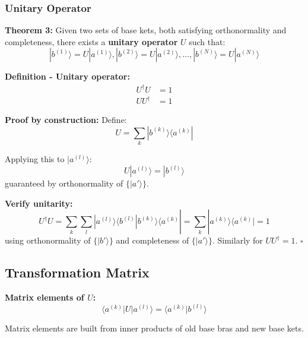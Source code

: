 \documentclass[11pt,a4paper]{article}
\begin{document}
\subsubsection{Unitary Operator}

\textbf{Theorem 3:} Given two sets of base kets, both satisfying orthonormality and completeness, there exists a \textbf{unitary operator} $U$ such that:
\begin{equation}
|b^{(1)}\rangle = U|a^{(1)}\rangle, |b^{(2)}\rangle = U|a^{(2)}\rangle, \ldots, |b^{(N)}\rangle = U|a^{(N)}\rangle
\tag{1.157}
\end{equation}

\textbf{Definition - Unitary operator:}
\begin{align}
U^\dagger U &= 1 \tag{1.158} \\
UU^\dagger &= 1 \tag{1.159}
\end{align}

\textbf{Proof by construction:}
Define:
\begin{equation}
U = \sum_k |b^{(k)}\rangle\langle a^{(k)}|
\tag{1.160}
\end{equation}

Applying this to $|a^{(l)}\rangle$:
\begin{equation}
U|a^{(l)}\rangle = |b^{(l)}\rangle
\tag{1.161}
\end{equation}
guaranteed by orthonormality of $\{|a'\rangle\}$.

\textbf{Verify unitarity:}
\begin{equation}
U^\dagger U = \sum_k\sum_l |a^{(l)}\rangle\langle b^{(l)}|b^{(k)}\rangle\langle a^{(k)}| = \sum_k |a^{(k)}\rangle\langle a^{(k)}| = 1
\tag{1.162}
\end{equation}
using orthonormality of $\{|b'\rangle\}$ and completeness of $\{|a'\rangle\}$. Similarly for $UU^\dagger = 1$. $\square$

\subsection{Transformation Matrix}

\textbf{Matrix elements of $U$:}
\begin{equation}
\langle a^{(k)}|U|a^{(l)}\rangle = \langle a^{(k)}|b^{(l)}\rangle
\tag{1.163}
\end{equation}

Matrix elements are built from inner products of old base bras and new base kets.
\end{document}
